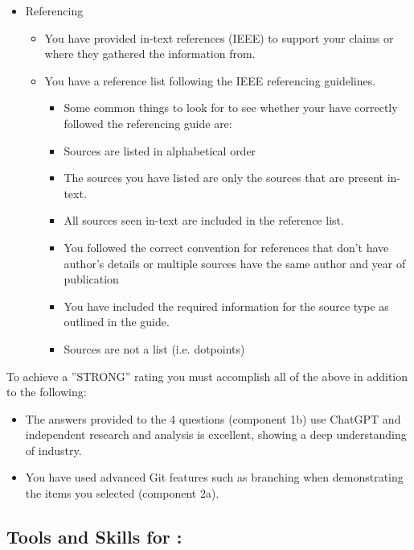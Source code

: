 \documentclass[a4paper, 11pt]{report}
\begin{document}
{\begin{itemize}
\begin{itemize}
\begin{itemize}
		\item You have included screenshots and annotations (where necessary) in your report and provided an explanation of $\sim$100 words of your use of advanced LaTeX features.
		\end{itemize}
	\end{itemize}
\item Referencing
	\begin {itemize}
	\item You have provided in-text references (IEEE) to support your claims or where they gathered the information from.
	\item You have a reference list following the IEEE referencing guidelines.
		\begin{itemize}
		\item Some common things to look for to see whether your have correctly followed the referencing guide are:
		\item Sources are listed in alphabetical order
		\item The sources you have listed are only the sources that are present in-text.
		\item All sources seen in-text are included in the reference list.
		\item You followed the correct convention for references that don’t have author’s details or multiple sources have the same author and year of publication
		\item You have included the required information for the source type as outlined in the guide.
		\item Sources are not a list (i.e. dotpoints)
		\end{itemize}
	\end{itemize}
\end{itemize}
To achieve a ''STRONG'' rating you must accomplish all of the above in addition to the following:
\begin{itemize}
\item The answers provided to the 4 questions (component 1b) use ChatGPT and independent research and analysis is excellent, showing a deep understanding of industry.
\item You have used advanced Git features such as branching when demonstrating the items you selected (component 2a).
\end{itemize}
\subsection{Tools and Skills for \majA: \studA}
}
\end{document}
